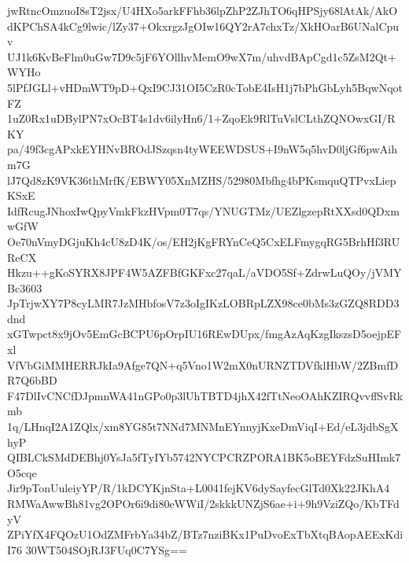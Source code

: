 jwRtncOmzuoI8sT2jsx/U4HXo5arkFFhb36lpZhP2ZJhTO6qHPSjy68lAtAk/AkO
dKPChSA4kCg9lwic/lZy37+OkxrgzJgOIw16QY2rA7chxTz/XkHOarB6UNalCpuv
UJ1k6KvBeFlm0uGw7D9c5jF6YOllhvMemO9wX7m/uhvdBApCgd1c5ZsM2Qt+WYHo
5lPfJGLl+vHDmWT9pD+QxI9CJ31OI5CzR0cTobE4IsH1j7bPhGbLyh5BqwNqotFZ
1uZ0Rx1uDBylPN7xOcBT4s1dv6ilyHn6/1+ZqoEk9RlTuVslCLthZQNOwxGI/RKY
pa/49f3cgAPxkEYHNvBROdJSzqsn4tyWEEWDSUS+I9nW5q5hvD0ljGf6pwAihm7G
lJ7Qd8zK9VK36thMrfK/EBWY05XnMZHS/52980Mbfhg4bPKsmquQTPvxLiepKSxE
IdfRcugJNhoxIwQpyVmkFkzHVpm0T7qs/YNUGTMz/UEZlgzepRtXXsd0QDxmwGfW
Oe70nVmyDGjuKh4cU8zD4K/os/EH2jKgFRYnCeQ5CxELFmygqRG5BrhHf3RUReCX
Hkzu++gKoSYRX8JPF4W5AZFBfGKFxc27qaL/aVDO5Sf+ZdrwLuQOy/jVMYBc3603
JpTrjwXY7P8cyLMR7JzMHbfosV7z3oIgIKzLOBRpLZX98ce0bMs3zGZQ8RDD3dnd
xGTwpct8x9jOv5EmGcBCPU6pOrpIU16REwDUpx/fmgAzAqKzgIkszsD5oejpEFxl
VfVbGiMMHERRJkIa9Afge7QN+q5Vno1W2mX0nURNZTDVfklHbW/2ZBmfDR7Q6bBD
F47DlIvCNCfDJpmnWA41nGPo0p3lUhTBTD4jhX42fTtNeoOAhKZIRQvvffSvRkmb
1q/LHnqI2A1ZQlx/xm8YG85t7NNd7MNMnEYnnyjKxeDmViqI+Ed/eL3jdbSgXhyP
QIBLCkSMdDEBhj0YsJa5fTyIYb5742NYCPCRZPORA1BK5oBEYFdzSuHImk7O5cqe
Jir9pTonUuleiyYP/R/1kDCYKjnSta+L0041fejKV6dySayfecGlTd0Xk22JKhA4
RMWaAwwBh81vg2OPOr6i9di80eWWiI/2skkkUNZjS6ae+i+9h9VziZQo/KbTFdyV
ZPiYfX4FQOzU1OdZMFrbYa34bZ/BTz7nziBKx1PuDvoExTbXtqBAopAEExKdiI76
30WT504SOjRJ3FUq0C7YSg==
